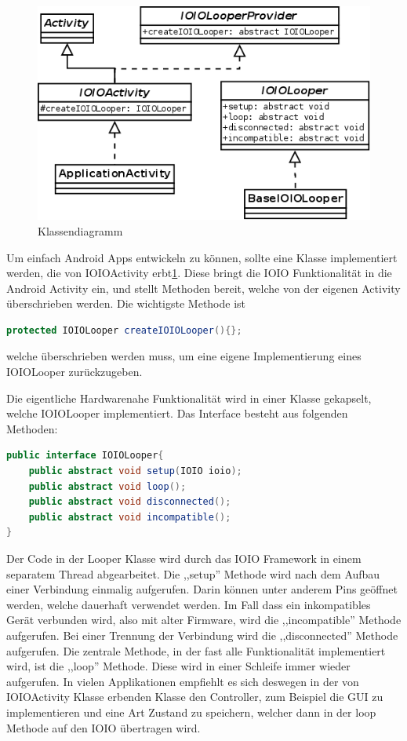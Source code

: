 \documentclass[12pt,journal,compsoc]{IEEEtran}
\begin{document}
\begin{figure}
	\centering
\includegraphics[width=\linewidth,angle=0]{media/classdiagram/Diagram1.png}
\caption{Klassendiagramm}
\label{fig:classdia}
\end{figure}



Um einfach Android Apps entwickeln zu können, sollte eine Klasse implementiert werden, die von IOIOActivity erbt\ref{fig:classdia}.
Diese bringt die IOIO Funktionalität in die Android Activity ein, und stellt Methoden bereit, welche von der eigenen Activity überschrieben werden.
Die wichtigste Methode ist 
\begin{lstlisting}[language=Java]
protected IOIOLooper createIOIOLooper(){};
\end{lstlisting}

welche überschrieben werden muss, um eine eigene Implementierung eines IOIOLooper zurückzugeben.

Die eigentliche Hardwarenahe Funktionalität wird in einer Klasse gekapselt, welche IOIOLooper implementiert. 
Das Interface besteht aus folgenden Methoden:

\begin{lstlisting}[language=Java,caption={Definitionen in IOIOLooper.java}]
public interface IOIOLooper{
	public abstract void setup(IOIO ioio);
	public abstract void loop();
	public abstract void disconnected();
	public abstract void incompatible();
}
\end{lstlisting}


Der Code in der Looper Klasse wird durch das IOIO Framework in einem separatem Thread abgearbeitet.
Die ,,setup'' Methode wird nach dem Aufbau einer Verbindung einmalig aufgerufen. Darin können unter anderem Pins geöffnet werden, welche dauerhaft verwendet werden.
Im Fall dass ein inkompatibles Gerät verbunden wird, also mit alter Firmware, wird die ,,incompatible'' Methode aufgerufen.
Bei einer Trennung der Verbindung wird die ,,disconnected'' Methode aufgerufen. 
Die zentrale Methode, in der fast alle Funktionalität implementiert wird, ist die ,,loop'' Methode.
Diese wird in einer Schleife immer wieder aufgerufen.
In vielen Applikationen empfiehlt es sich deswegen in der von IOIOActivity Klasse erbenden Klasse den Controller, zum Beispiel die GUI zu implementieren und eine Art Zustand zu speichern, welcher dann in der loop Methode auf den IOIO übertragen wird. 
\end{document}
